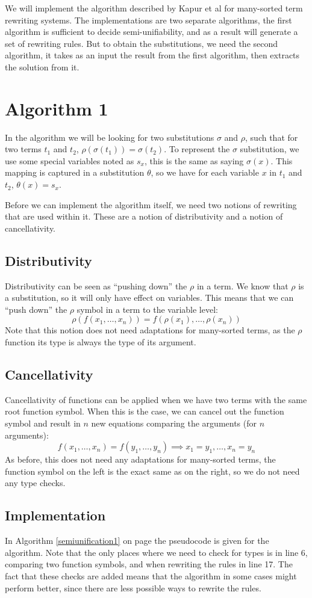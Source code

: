 We will implement the algorithm described by Kapur et al for many-sorted term rewriting systems. The implementations are two separate algorithms, the first algorithm is sufficient to decide semi-unifiability, and as a result will generate a set of rewriting rules. But to obtain the substitutions, we need the second algorithm, it takes as an input the result from the first algorithm, then extracts the solution from it.

\section{Algorithm 1}
In the algorithm we will be looking for two substitutions $\sigma$ and $\rho$, such that for two terms $t_1$ and $t_2$, $\rho(\sigma(t_1)) = \sigma(t_2)$. To represent the $\sigma$ substitution, we use some special variables noted as $s_x$, this is the same as saying $\sigma(x)$. This mapping is captured in a substitution $\theta$, so we have for each variable $x$ in $t_1$ and $t_2$, $\theta(x) = s_x$. 

Before we can implement the algorithm itself, we need two notions of rewriting that are used within it. These are a notion of distributivity and a notion of cancellativity. 
\subsection{Distributivity}
Distributivity can be seen as ``pushing down'' the $\rho$ in a term. We know that $\rho$ is a substitution, so it will only have effect on variables. This means that we can ``push down'' the $\rho$ symbol in a term to the variable level:
$$ \rho(f(x_1, \dots, x_n)) = f(\rho(x_1), \dots, \rho(x_n)) $$
Note that this notion does not need adaptations for many-sorted terms, as the $\rho$ function its type is always the type of its argument. 
\subsection{Cancellativity}
Cancellativity of functions can be applied when we have two terms with the same root function symbol. When this is the case, we can cancel out the function symbol and result in $n$ new equations comparing the arguments (for $n$ arguments):
$$ f(x_1, \dots, x_n) = f(y_1, \dots, y_n) \implies x_1 = y_1, \dots, x_n = y_n $$
As before, this does not need any adaptations for many-sorted terms, the function symbol on the left is the exact same as on the right, so we do not need any type checks. 
\subsection{Implementation}
In Algorithm \ref{semiunification1} on page \pageref{semiunification1} the pseudocode is given for the algorithm. Note that the only places where we need to check for types is in line 6, comparing two function symbols, and when rewriting the rules in line 17. The fact that these checks are added means that the algorithm in some cases might perform better, since there are less possible ways to rewrite the rules.

